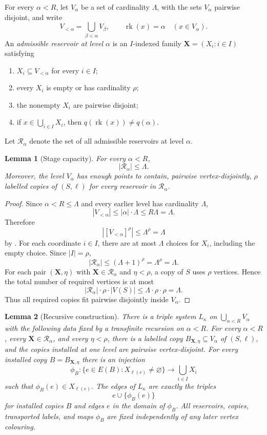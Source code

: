 \documentclass[11pt]{amsart}
\newtheorem{lemma}[lemma]{Lemma}
\theoremstyle{definition}
\theoremstyle{remark}
\numberwithin{equation}{section}
\DeclareMathOperator{\rk}{rk}
\begin{document}
For every $\alpha<R$, let $V_\alpha$ be a set of cardinality $\Lambda$,
with the sets $V_\alpha$ pairwise disjoint, and write
\[
 V_{<\alpha}=\bigcup_{\beta<\alpha}V_\beta,
 \qquad
 \rk(x)=\alpha\quad(x\in V_\alpha).
\]
An \emph{admissible reservoir at level $\alpha$} is an $I$-indexed
family $\mathbf X=(X_i:i\in I)$ satisfying
\begin{enumerate}[label=\textup{(R\arabic*)}]
\item $X_i\subseteq V_{<\alpha}$ for every $i\in I$;
\item every $X_i$ is empty or has cardinality $\rho$;
\item the nonempty $X_i$ are pairwise disjoint;
\item if $x\in\bigcup_{i\in I}X_i$, then
$q(\rk(x))\ne q(\alpha)$.
\end{enumerate}
Let $\mathcal R_\alpha$ denote the set of all admissible reservoirs at
level $\alpha$.

\begin{lemma}[Stage capacity]
\label{lem:stage-capacity}
For every $\alpha<R$,
\[
 |\mathcal R_\alpha|\le\Lambda.
\]
Moreover, the level $V_\alpha$ has enough points to contain, pairwise
vertex-disjointly, $\rho$ labelled copies of $(S,\ell)$ for every
reservoir in $\mathcal R_\alpha$.
\end{lemma}

\begin{proof}
Since $\alpha<R\le\Lambda$ and every earlier level has cardinality
$\Lambda$,
\[
 |V_{<\alpha}|\le |\alpha|\cdot\Lambda\le R\Lambda=\Lambda.
\]
Therefore
\[
 |[V_{<\alpha}]^\rho|\le\Lambda^\rho=\Lambda
\]
by .  For each coordinate $i\in I$, there are at
most $\Lambda$ choices for $X_i$, including the empty choice.  Since
$|I|=\rho$,
\[
 |\mathcal R_\alpha|
 \le(\Lambda+1)^\rho
 =\Lambda^\rho
 =\Lambda.
\]
For each pair $(\mathbf X,\eta)$ with
$\mathbf X\in\mathcal R_\alpha$ and $\eta<\rho$, a copy of $S$ uses
$\rho$ vertices.  Hence the total number of required vertices is at most
\[
 |\mathcal R_\alpha|\cdot\rho\cdot|V(S)|
 \le\Lambda\cdot\rho\cdot\rho
 =\Lambda.
\]
Thus all required copies fit pairwise disjointly inside $V_\alpha$.
\end{proof}

\begin{lemma}[Recursive construction]
\label{lem:calibration-construction}
There is a triple system $L_\kappa$ on
$\bigcup_{\alpha<R}V_\alpha$ with the following data fixed by a
transfinite recursion on $\alpha<R$.
For every $\alpha<R$, every $\mathbf X\in\mathcal R_\alpha$, and every
$\eta<\rho$, there is a labelled copy
$B_{\mathbf X,\eta}\subseteq V_\alpha$ of $(S,\ell)$, and the copies
installed at one level are pairwise vertex-disjoint.  For every installed
copy $B=B_{\mathbf X,\eta}$ there is an injection
\[
 \phi_B:
 \{e\in E(B):X_{\ell(e)}\ne\varnothing\}
 \longrightarrow \bigcup_{i\in I}X_i
\]
such that $\phi_B(e)\in X_{\ell(e)}$.  The edges of $L_\kappa$ are
exactly the triples
\[
 e\cup\{\phi_B(e)\}
\]
for installed copies $B$ and edges $e$ in the domain of $\phi_B$.
All reservoirs, copies, transported labels, and maps $\phi_B$ are fixed
independently of any later vertex colouring.
\end{lemma}
\end{document}
